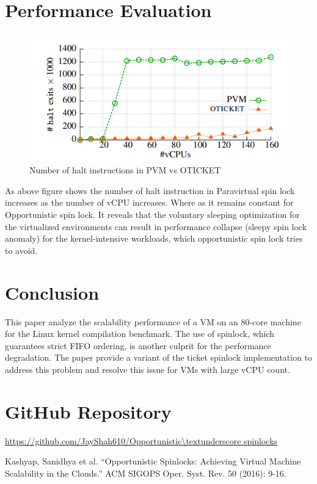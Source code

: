 \documentclass[conference]{IEEEtran}
\begin{document}
\section{Performance Evaluation}
\begin{figure}[!h]
    \centering
    \includegraphics[scale = 1.0]{Performance_2.PNG}
    \caption{Number of halt instructions in PVM vs OTICKET}
    \label{Fig.3}
\end{figure}
\FloatBarrier
As above figure shows the number of halt instruction in Paravirtual spin lock increases as the number of vCPU increases. Where as it remains constant for Opportunistic spin lock.
It reveals that the voluntary sleeping optimization
for the virtualized environments can result in performance collapse
(sleepy spin lock anomaly) for the kernel-intensive workloads, which opportunistic spin lock tries to avoid.
\newline

\section{Conclusion}
This paper analyze the scalability performance of a VM on an 80-core machine for the Linux kernel compilation benchmark.
The use of spinlock, which guarantees strict FIFO ordering, is another culprit for the performance degradation.
The paper provide a variant of the ticket spinlock implementation to address this problem and resolve this issue for VMs with large vCPU count.
\newline

\section{GitHub Repository}
\url{https://github.com/JayShah610/Opportunistic\textunderscore spinlocks}
\newline


\begin{thebibliography}{00}
 Kashyap, Sanidhya et al. “Opportunistic Spinlocks: Achieving Virtual Machine Scalability in the Clouds.” ACM SIGOPS Oper. Syst. Rev. 50 (2016): 9-16.

\end{thebibliography}
\vspace{12pt}
\end{document}
